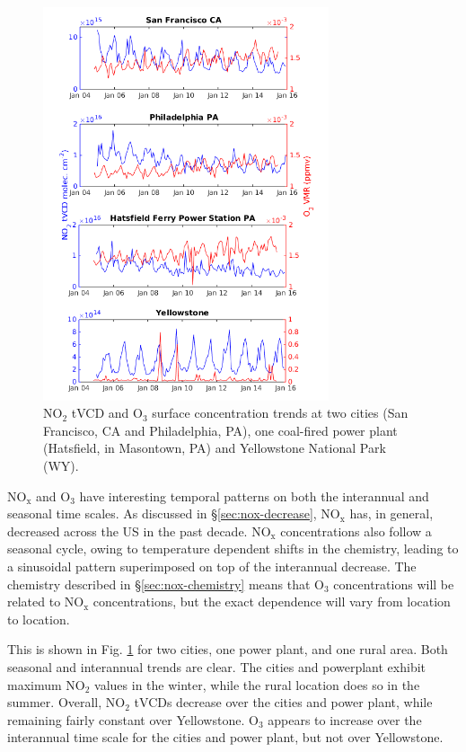 \documentclass[a4paper,10pt,oneside]{article}
\newcommand{\ce}[1]{$\mathrm{#1}$}
\begin{document}
\begin{sloppy}
\begin{figure}
\centering
\includegraphics[width=0.75\textwidth]{figs/four-site-trends.png} 
\caption{\ce{NO_2} tVCD and \ce{O_3} surface concentration trends at two cities (San Francisco, CA and Philadelphia, PA), one coal-fired power plant (Hatsfield, in Masontown, PA) and Yellowstone National Park (WY).}
\label{fig:trends}
\end{figure}

\ce{NO_x} and \ce{O_3} have interesting temporal patterns on both the interannual and seasonal time scales. As discussed in \S\ref{sec:nox-decrease}, \ce{NO_x} has, in general, decreased across the US in the past decade. \ce{NO_x} concentrations also follow a seasonal cycle, owing to temperature dependent shifts in the chemistry, leading to a sinusoidal pattern superimposed on top of the interannual decrease.  The chemistry described in \S\ref{sec:nox-chemistry} means that \ce{O_3} concentrations will be related to \ce{NO_x} concentrations, but the exact dependence will vary from location to location.

This is shown in Fig. \ref{fig:trends} for two cities, one power plant, and one rural area. Both seasonal and interannual trends are clear. The cities and powerplant exhibit maximum \ce{NO_2} values in the winter, while the rural location does so in the summer. Overall, \ce{NO_2} tVCDs decrease over the cities and power plant, while remaining fairly constant over Yellowstone. \ce{O_3} appears to increase over the interannual time scale for the cities and power plant, but not over Yellowstone. 


\end{sloppy}
\end{document}
